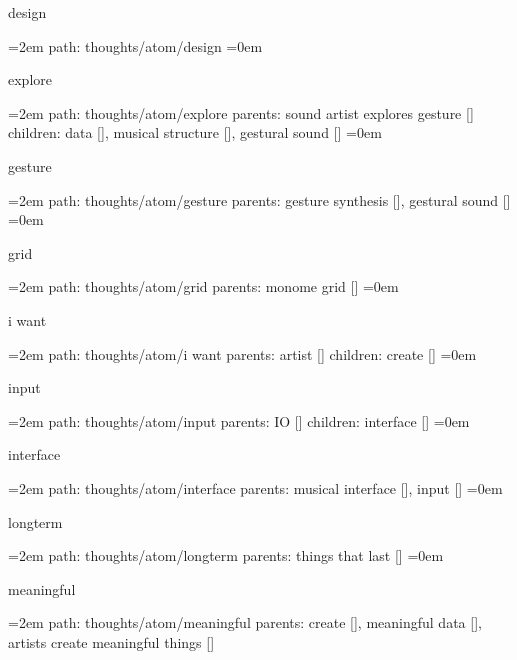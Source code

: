 \bigskip
{}
design
\smallskip
\par\begingroup
\leftskip=2em
path: thoughts/atom/design
\smallskip
\leftskip=0em
\par\endgroup
\bigskip
{}
explore
\smallskip
\par\begingroup
\leftskip=2em
path: thoughts/atom/explore
\smallskip
parents:  sound artist explores gesture []
\smallskip
children: data [], musical structure [], gestural sound []
\smallskip
\leftskip=0em
\par\endgroup
\bigskip
{}
gesture
\smallskip
\par\begingroup
\leftskip=2em
path: thoughts/atom/gesture
\smallskip
parents:  gesture synthesis [], gestural sound []
\smallskip
\leftskip=0em
\par\endgroup
\bigskip
{}
grid
\smallskip
\par\begingroup
\leftskip=2em
path: thoughts/atom/grid
\smallskip
parents:  monome grid []
\smallskip
\leftskip=0em
\par\endgroup
\bigskip
{}
i want
\smallskip
\par\begingroup
\leftskip=2em
path: thoughts/atom/i want
\smallskip
parents:  artist []
\smallskip
children: create []
\smallskip
\leftskip=0em
\par\endgroup
\bigskip
{}
input
\smallskip
\par\begingroup
\leftskip=2em
path: thoughts/atom/input
\smallskip
parents:  IO []
\smallskip
children: interface []
\smallskip
\leftskip=0em
\par\endgroup
\bigskip
{}
interface
\smallskip
\par\begingroup
\leftskip=2em
path: thoughts/atom/interface
\smallskip
parents:  musical interface [], input []
\smallskip
\leftskip=0em
\par\endgroup
\bigskip
{}
longterm
\smallskip
\par\begingroup
\leftskip=2em
path: thoughts/atom/longterm
\smallskip
parents:  things that last []
\smallskip
\leftskip=0em
\par\endgroup
\bigskip
{}
meaningful
\smallskip
\par\begingroup
\leftskip=2em
path: thoughts/atom/meaningful
\smallskip
parents:  create [], meaningful data [], artists create meaningful things []
\smallskip
